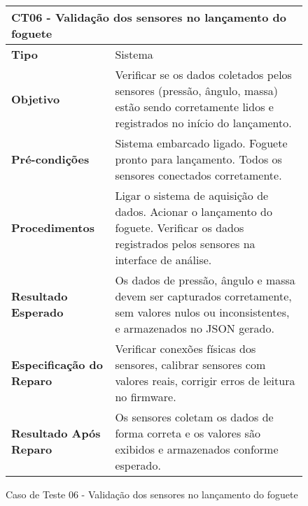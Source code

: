 \begin{figure}[H]
    \centering
\begin{longtable}{|p{}|p{}|}
\hline
\multicolumn{2}{|l|}{\textbf{CT06 - Validação dos sensores no lançamento do foguete}} \\
\hline
\textbf{Tipo} & Sistema \\
\hline
\textbf{Objetivo} & Verificar se os dados coletados pelos sensores (pressão, ângulo, massa) estão sendo corretamente lidos e registrados no início do lançamento. \\
\hline
\textbf{Pré-condições} & Sistema embarcado ligado.  Foguete pronto para lançamento.  Todos os sensores conectados corretamente. \\
\hline
\textbf{Procedimentos} & Ligar o sistema de aquisição de dados.  Acionar o lançamento do foguete.  Verificar os dados registrados pelos sensores na interface de análise. \\
\hline
\textbf{Resultado Esperado} & Os dados de pressão, ângulo e massa devem ser capturados corretamente, sem valores nulos ou inconsistentes, e armazenados no JSON gerado. \\
\hline
\textbf{Especificação do Reparo} & Verificar conexões físicas dos sensores, calibrar sensores com valores reais, corrigir erros de leitura no firmware. \\
\hline
\textbf{Resultado Após Reparo} & Os sensores coletam os dados de forma correta e os valores são exibidos e armazenados conforme esperado. \\
\hline
\end{longtable}
\caption{Caso de Teste 06 - Validação dos sensores no lançamento do foguete}
\label{fig_ct07_validacao_sensores_lancamento_foguete}
\end{figure}

